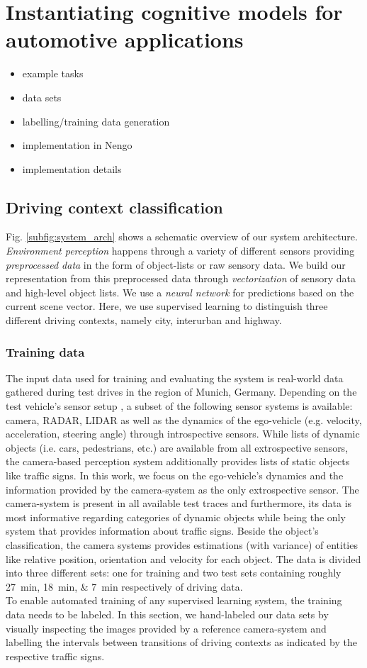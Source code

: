 \chapter{Instantiating cognitive models for automotive applications}
\begin{itemize}
	\item example tasks
	\item data sets
	\item labelling/training data generation
	\item implementation in \ac{Nengo}
	\item implementation details
\end{itemize}
\section{Driving context classification}
\label{sec:driving_context_class}
Fig. \ref{subfig:system_arch} shows a schematic overview of our system architecture.
\textit{Environment perception} happens through a variety of different sensors \cite{Aeberhard2015} providing \textit{preprocessed data} in the form of object-lists or raw sensory data.
We build our representation from this preprocessed data through \textit{vectorization} of sensory data and high-level object lists.
We use a \textit{neural network} for predictions based on the current scene vector.
Here, we use supervised learning to distinguish three different driving contexts, namely city, interurban and highway.
\subsection{Training data}
The input data used for training and evaluating the system is real-world data gathered during test drives in the region of Munich, Germany.
Depending on the test vehicle's sensor setup \cite{Aeberhard2015}, a subset of the following sensor systems is available: camera, RADAR, LIDAR as well as the dynamics of the ego-vehicle (e.g. velocity, acceleration, steering angle) through introspective sensors.
While lists of dynamic objects (i.e. cars, pedestrians, etc.) are available from all extrospective sensors, the camera-based perception system additionally provides lists of static objects like traffic signs.
In this work, we focus on the ego-vehicle's dynamics and the information provided by the camera-system as the only extrospective sensor.
The camera-system is present in all available test traces and furthermore, its data is most informative regarding categories of dynamic objects while being the only system that provides information about traffic signs.
Beside the object's classification, the camera systems provides estimations (with variance) of entities like relative position, orientation and velocity for each object.
The data is divided into three different sets: one for training and two test sets containing roughly \SIlist{27;18;7}{\minute} respectively of driving data.\\
To enable automated training of any supervised learning system, the training data needs to be labeled.
In this section, we hand-labeled our data sets by visually inspecting the images provided by a reference camera-system and labelling the intervals  between transitions of driving contexts as indicated by the respective traffic signs.
